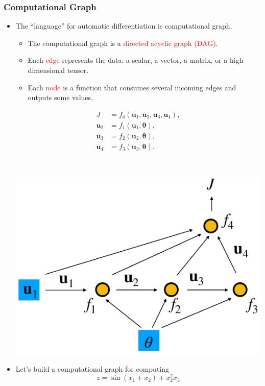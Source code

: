 \documentclass{beamer}
\newcommand{\red}[1]{\textcolor{red}{#1}}
\begin{document}
\begin{frame}
	\frametitle{Computational Graph}
	
	\begin{itemize}
	\item The ``language'' for automatic differentiation is computational graph. 
	\begin{itemize}
	\item The computational graph is a \red{directed acyclic graph (DAG)}. 
	\item Each \red{edge} represents the data: a scalar, a vector, a matrix, or a high dimensional tensor. 
	\item Each \red{node} is a function that consumes several incoming edges and outputs some values. 
	\end{itemize}
	\begin{minipage}[c]{0.45\textwidth}
		\begin{align*}
  J &= f_4(\mathbf{u}_1, \mathbf{u}_2, \mathbf{u}_3, \mathbf{u}_4), \\
  \mathbf{u}_2 &= f_1(\mathbf{u}_1, \bm {\theta}), \\
       \mathbf{u}_3 &= f_2(\mathbf{u}_2, \bm {\theta}),\\
        \mathbf{u}_4 &= f_3(\mathbf{u}_3, \bm {\theta}).
\end{align*}
	\end{minipage}~
	\begin{minipage}[c]{0.45\textwidth}
		\includegraphics[width=1.0\textwidth]{../adjoint}
	\end{minipage}
	\item  Let's build a computational graph for computing 
 $$z=\sin(x_1+x_2) + x_2^2x_3$$
 
	\end{itemize}
\end{frame}
\end{document}

